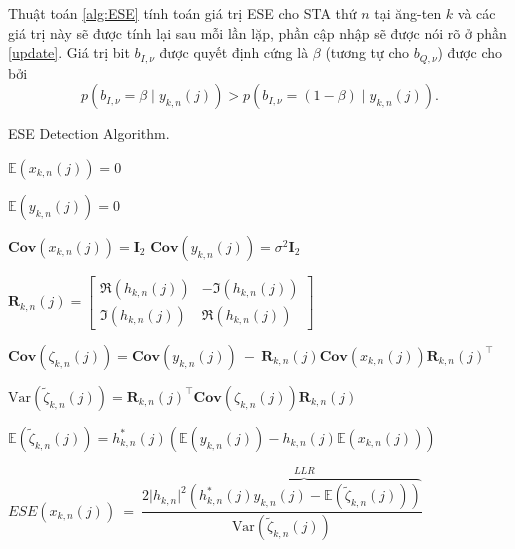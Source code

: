 Thuật toán \ref{alg:ESE} tính toán giá trị ESE cho STA thứ $n$ tại ăng-ten $k$ và các giá trị này sẽ được tính lại sau mỗi lần lặp, phần cập nhập sẽ được nói rõ ở phần \ref{update}.
Giá trị bit $b_{I,\nu}$ được quyết định cứng là $\beta$ (tương tự cho $b_{Q,\nu}$) được cho bởi
\begin{equation}
    p(b_{I,\nu} = \beta \mid y_{k,n}(j)) > p(b_{I,\nu} = (1-\beta) \mid y_{k,n}(j)). \label{eq:4}
\end{equation}

\begin{algorithm}
    \caption{ESE Detection Algorithm.}\label{alg:ESE}
    \begin{algorithmic}[1]
    
                \State $\mathbb{E}(x_{k,n}(j)) = 0$     
    
                \State $\mathbb{E}(y_{k,n}(j)) = 0$
    
                \State $\textbf{Cov}(x_{k,n}(j)) = \textbf{I}_2$
                \State $\textbf{Cov}(y_{k,n}(j)) = \sigma^2\textbf{I}_2$
    
                \State $\textbf{R}_{k,n}(j)=
                \begin{bmatrix}
                    \Re(h_{k,n}(j))   & -\Im(h_{k,n}(j))  \\ 
                    \Im(h_{k,n}(j))   & \Re(h_{k,n}(j))
                \end{bmatrix}$
    
                \State $\textbf{Cov}(\zeta_{k,n}(j))=\textbf{Cov}(y_{k,n}(j))~-~\textbf{R}_{k,n}(j)\textbf{Cov}(x_{k,n}(j)) \textbf{R}_{k,n}(j)^\top$
    
                \State $\text{Var}(\tilde{\zeta}_{k,n}(j)) = \textbf{R}_{k,n}(j)^\top \textbf{Cov}(\zeta_{k,n}(j)) \textbf{R}_{k,n}(j)$
    
                \State $\mathbb{E}(\tilde{\zeta}_{k,n}(j)) = h_{k,n}^{*}(j)(\mathbb{E}(y_{k,n}(j)) - h_{k,n}(j) \mathbb{E}(x_{k,n}(j)))$
    
                \State $ESE(x_{k,n}(j))~=~\dfrac{2\lvert h_{k,n}\rvert^2\overbrace{(h_{k,n}^{*}(j) y_{k,n}(j) - \mathbb{E}(\tilde{\zeta}_{k,n}(j)))}^{LLR}}{\text{Var}(\tilde{\zeta}_{k,n}(j))}$                                  
    
    
        \EndProcedure
    \end{algorithmic}
\end{algorithm}

